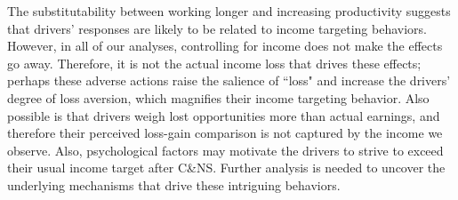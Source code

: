 \documentclass[reviewmode]{restud}
\begin{document}
The substitutability between working longer and increasing productivity suggests that drivers' responses are likely to be related to income targeting behaviors. However, in all of our analyses, controlling for income does not make the effects go away. Therefore, it is not the actual income loss that drives these effects; perhaps these adverse actions raise the salience of ``loss" and increase the drivers' degree of loss aversion, which magnifies their income targeting behavior. Also possible is that drivers weigh lost opportunities more than actual earnings, and therefore their perceived loss-gain comparison is not captured by the income we observe. Also, psychological factors may motivate the drivers to strive to exceed their usual income target after C\&NS. Further analysis is needed to uncover the underlying mechanisms that drive these intriguing behaviors.



\end{document}

